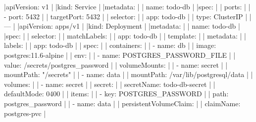 \beginlines
|apiVersion: v1                              |
|kind: Service                               |
|metadata:                                   |
|  name: todo-db                             |
|spec:                                       |
|  ports:                                    |
|    - port: 5432                            |
|      targetPort: 5432                      |
|  selector:                                 |
|    app: todo-db                            |
|  type: ClusterIP                           |
|---                                         |
|apiVersion: apps/v1                        |
|kind: Deployment                           |
|metadata:                                  |
|  name: todo-db                            |
|spec:                                      |
|  selector:                                |
|    matchLabels:                           |
|      app: todo-db                         |
|  template:                                |
|    metadata:                              |
|      labels:                              |
|        app: todo-db                       |
|    spec:                                  |
|      containers:                          |
|        - name: db                         |
|          image: postgres:11.6-alpine      |
|          env:                             |
|          - name: POSTGRES_PASSWORD_FILE   |
|            value: /secrets/postgres_password |
|          volumeMounts:                    |
|            - name: secret                 |
|              mountPath: "/secrets"        |
|            - name: data                   |
|              mountPath: /var/lib/postgresql/data |
|      volumes:                             |
|        - name: secret                     |
|          secret:                          |
|            secretName: todo-db-secret     |
|            defaultMode: 0400              |
|            items:                         |
|            - key: POSTGRES_PASSWORD       |
|              path: postgres_password      |
|        - name: data                       |
|          persistentVolumeClaim:           |
|            claimName: postgres-pvc        |
\endlines

























